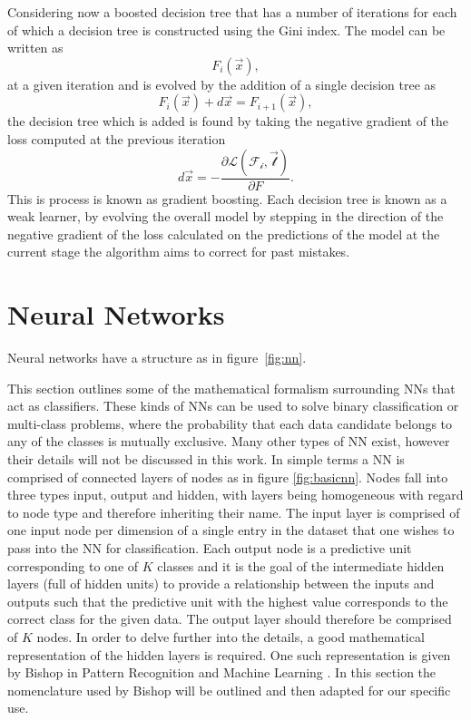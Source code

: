 Considering now a boosted decision tree that has a number of iterations for each
of which a decision tree is constructed using the Gini index. The model can be
written as
\begin{equation}
  F_i(\vec{x}),
\end{equation}
at a given iteration and is evolved by the addition of a single decision tree as
\begin{equation}
  F_i({\vec{x}}) + d{\vec{x}} = F_{i+1}(\vec{x}),
\end{equation}
the decision tree which is added is found by taking the negative gradient of the
loss computed at the previous iteration
\begin{equation}
  d{\vec{x}} = - \frac{\partial \mathcal{L(F_i, \vec{t})}}{\partial F}.
\end{equation}
This is process is known as gradient boosting. Each decision tree is known as a
weak learner, by evolving the overall model by stepping in the direction of the
negative gradient of the loss calculated on the predictions of the model at the
current stage the algorithm aims to correct for past mistakes.

\section{Neural Networks}%
\label{sec:neural-networks}
Neural networks have a structure as in figure~\ref{fig:nn}.

This section outlines some of the mathematical formalism surrounding NNs
that act as classifiers. These kinds of NNs can be used to solve binary
classification or multi-class problems, where the probability that each data
candidate belongs to any of the classes is mutually exclusive. Many other types
of NN exist, however their details will not be discussed in this work. In simple
terms a NN is comprised of connected layers of nodes as in figure
\ref{fig:basicnn}. Nodes fall into three types input, output and hidden, with
layers being homogeneous with regard to node type and therefore inheriting their
name. The input layer is comprised of one input node per dimension of a single
entry in the dataset that one wishes to pass into the NN for classification.
Each output node is a predictive unit corresponding to one of $K$ classes and it
is the goal of the intermediate hidden layers (full of hidden units) to provide
a relationship between the inputs and outputs such that the predictive unit with
the highest value corresponds to the correct class for the given data. The
output layer should therefore be comprised of $K$ nodes. In order to delve
further into the details, a good mathematical representation of the hidden
layers is required. One such representation is given by Bishop in Pattern
Recognition and Machine Learning \cite{PRML}. In this section the nomenclature
used by Bishop will be outlined and then adapted for our specific use.

